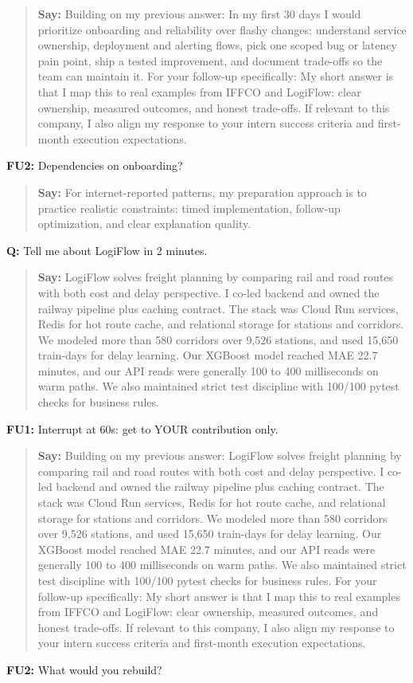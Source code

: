 \documentclass[9pt,a4paper]{article}
\begin{document}
\begin{quote}\small\textbf{Say:} Building on my previous answer: In my first 30 days I would prioritize onboarding and reliability over flashy changes: understand service ownership, deployment and alerting flows, pick one scoped bug or latency pain point, ship a tested improvement, and document trade-offs so the team can maintain it. For your follow-up specifically: My short answer is that I map this to real examples from IFFCO and LogiFlow: clear ownership, measured outcomes, and honest trade-offs. If relevant to this company, I also align my response to your intern success criteria and first-month execution expectations.\end{quote}
\vspace{2mm}
\textbf{FU2:} Dependencies on onboarding?

\begin{quote}\small\textbf{Say:} For internet-reported patterns, my preparation approach is to practice realistic constraints: timed implementation, follow-up optimization, and clear explanation quality.\end{quote}
\vspace{2mm}
\textbf{Q:} Tell me about LogiFlow in 2 minutes.

\begin{quote}\small\textbf{Say:} LogiFlow solves freight planning by comparing rail and road routes with both cost and delay perspective. I co-led backend and owned the railway pipeline plus caching contract. The stack was Cloud Run services, Redis for hot route cache, and relational storage for stations and corridors. We modeled more than 580 corridors over 9,526 stations, and used 15,650 train-days for delay learning. Our XGBoost model reached MAE 22.7 minutes, and our API reads were generally 100 to 400 milliseconds on warm paths. We also maintained strict test discipline with 100/100 pytest checks for business rules.\end{quote}
\vspace{2mm}
\textbf{FU1:} Interrupt at 60s: get to YOUR contribution only.

\begin{quote}\small\textbf{Say:} Building on my previous answer: LogiFlow solves freight planning by comparing rail and road routes with both cost and delay perspective. I co-led backend and owned the railway pipeline plus caching contract. The stack was Cloud Run services, Redis for hot route cache, and relational storage for stations and corridors. We modeled more than 580 corridors over 9,526 stations, and used 15,650 train-days for delay learning. Our XGBoost model reached MAE 22.7 minutes, and our API reads were generally 100 to 400 milliseconds on warm paths. We also maintained strict test discipline with 100/100 pytest checks for business rules. For your follow-up specifically: My short answer is that I map this to real examples from IFFCO and LogiFlow: clear ownership, measured outcomes, and honest trade-offs. If relevant to this company, I also align my response to your intern success criteria and first-month execution expectations.\end{quote}
\vspace{2mm}
\textbf{FU2:} What would you rebuild?
\end{document}
